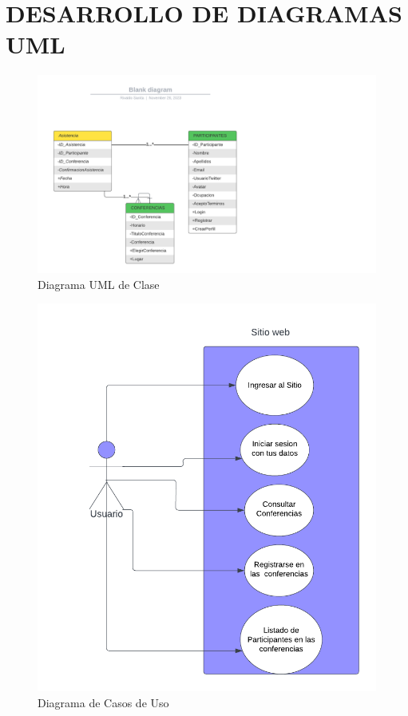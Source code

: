 \chapter{DESARROLLO DE DIAGRAMAS UML}

\begin{figure}[H]
	\centering
	\includegraphics[width=1\linewidth]{Imagenes/Diagramas/UML}
	\caption{Diagrama UML de Clase}
	\label{fig:uml}
\end{figure}

\begin{figure}[H]
	\centering
	\includegraphics[width=0.9\linewidth]{Imagenes/Diagramas/Casos de uso}
	\caption{Diagrama de Casos de Uso}
	\label{fig:casos-de-uso}
\end{figure}


